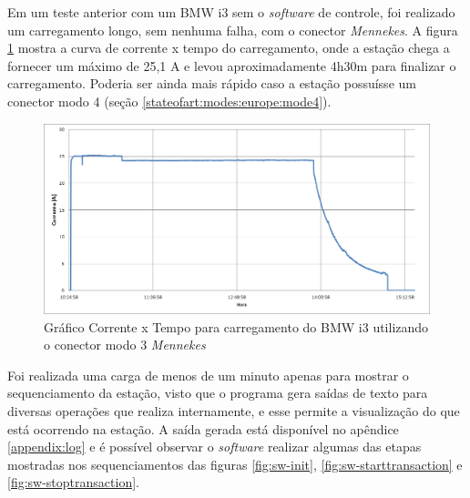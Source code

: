     Em um teste anterior com um BMW i3 sem o \textit{software} de controle, foi realizado um carregamento longo, sem nenhuma falha, com o conector \textit{Mennekes}. A figura \ref{fig:evse-charge} mostra a curva de corrente x tempo do carregamento, onde a estação chega a fornecer um máximo de 25,1 A e levou aproximadamente 4h30m para finalizar o carregamento. Poderia ser ainda mais rápido caso a estação possuísse um conector modo 4 (seção \ref{stateofart:modes:europe:mode4}).

    \begin{figure}[H]
      \begin{center}
        \includegraphics[width=\textwidth,natwidth=1420,natheight=2130]{assets/images/evse-charge.png}
        \caption{Gráfico Corrente x Tempo para carregamento do BMW i3 utilizando o conector modo 3 \textit{Mennekes}}
        \label{fig:evse-charge}
      \end{center}
    \end{figure}

    Foi realizada uma carga de menos de um minuto apenas para mostrar o sequenciamento da estação, visto que o programa gera saídas de texto para diversas operações que realiza internamente, e esse permite a visualização do que está ocorrendo na estação. A saída gerada está disponível no apêndice \ref{appendix:log} e é possível observar o \textit{software} realizar algumas das etapas mostradas nos sequenciamentos das figuras \ref{fig:sw-init}, \ref{fig:sw-starttransaction} e \ref{fig:sw-stoptransaction}.

